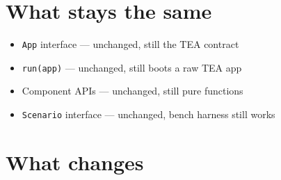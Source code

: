 \section{What stays the same}\label{record-373-what-stays-the-same}

\begin{itemize}
\tightlist
\item
  \texttt{A\allowbreak{}p\allowbreak{}p} interface --- unchanged, still the TEA contract
\item
  \texttt{r\allowbreak{}u\allowbreak{}n\allowbreak{}(\allowbreak{}a\allowbreak{}p\allowbreak{}p\allowbreak{})} --- unchanged, still boots a raw TEA app
\item
  Component APIs --- unchanged, still pure functions
\item
  \texttt{S\allowbreak{}c\allowbreak{}e\allowbreak{}n\allowbreak{}a\allowbreak{}r\allowbreak{}i\allowbreak{}o} interface --- unchanged, bench harness still works
\end{itemize}

\section{What changes}\label{record-373-what-changes}

